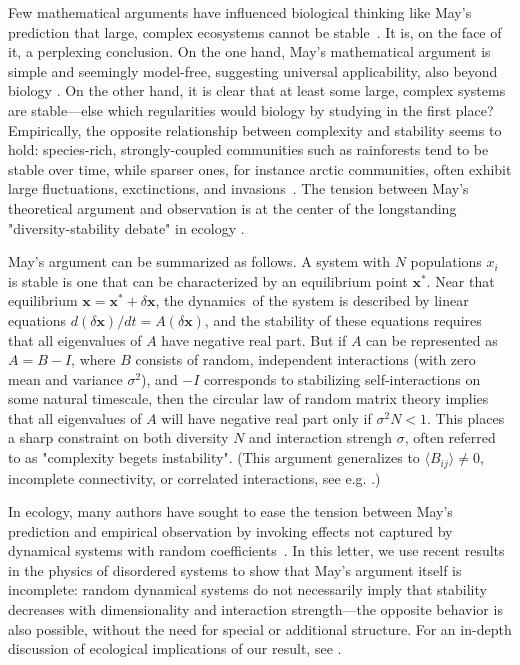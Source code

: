 
Few mathematical arguments have influenced biological thinking like May's prediction that large, complex ecosystems cannot be stable~\cite{May1972}.
It is, on the face of it, a perplexing conclusion.
On the one hand, May's mathematical argument is simple and seemingly model-free, suggesting universal applicability, also beyond biology \cite{Haldane2011, Moran2019}.
On the other hand, it is clear that at least some large, complex systems are stable---else which regularities would biology by studying in the first place? 
Empirically, the opposite relationship between complexity and stability seems to hold: species-rich, strongly-coupled communities such as rainforests tend to be stable over time, while sparser ones, for instance arctic communities, often exhibit large fluctuations, exctinctions, and invasions~\cite{Hutchinson1959,Odum1959,MacArthur1955}. 
The tension between May's theoretical argument and  observation is at the center of the longstanding "diversity-stability debate" in ecology \cite{McCann2000, Loreau2022}.

May's argument can be summarized as follows.
A system with $N$ populations $x_i$ is stable is one that can be characterized by an equilibrium point $\mathbf x^*$.
Near that equilibrium $\mathbf x = \mathbf x^* + \delta \mathbf x$, the dynamics of the system is described by linear equations $d(\delta \mathbf x)/dt = A (\delta \mathbf x)$, and the stability of these equations requires that all eigenvalues of $A$ have negative real part.
But if $A$ can be represented as $A = B - I$, where $B$ consists of random, independent interactions (with zero 
mean and variance $\sigma^2$), and $-I$ corresponds to stabilizing self-interactions on some natural timescale, 
then the circular law of random matrix theory implies that all eigenvalues of $A$ will have negative real part only if $\sigma^2 N < 1$.
This places a sharp constraint on both diversity $N$ and interaction strengh $\sigma$, often referred to as "complexity begets instability".
(This argument generalizes to $\langle B_{ij}\rangle \neq 0$, incomplete connectivity, or correlated interactions, see e.g. \cite{allesina2015stability}.)

In ecology, many authors have sought to ease the tension between May's prediction and empirical observation by invoking effects not captured by dynamical systems with random coefficients~\cite{McCann2000,Chesson2000,Mougi2012,Rohr2014,Barabas2017,Grilli2017}. 
In this letter, we use recent results in the physics of disordered systems \cite{Ahmadian2015, Roy2019} to show that May's argument itself is incomplete: random dynamical systems do not necessarily imply that stability decreases with dimensionality and interaction strength---the opposite behavior is also possible, without the need for special or additional structure.
For an in-depth discussion of ecological implications of our result, see \cite{Mazzarisi2023}.